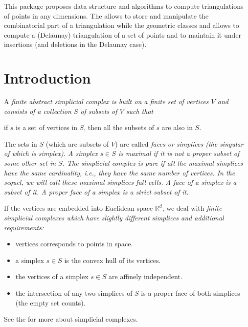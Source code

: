 
\newcommand{\note}[1]{\begin{ccTexOnly}%
{\color{red}$\langle\!\langle$#1$\rangle\!\rangle$}\end{ccTexOnly}}
\newcommand{\sphere}{\ensuremath{\mathcal S}}
\renewcommand{\real}{\ensuremath{\mathbb R}}

This package proposes data structure and algorithms to compute
triangulations of points in any dimensions.
The  allows to store and manipulate the
combinatorial part of a triangulation while the geometric classes
 and  allows to 
compute a (Delaunay) triangulation of a set of points and to maintain
it under insertions (and deletions in the Delaunay case).


\section{Introduction\label{triangulation:intro}}

A \em{finite abstract simplicial complex} is built on a finite set of
vertices $V$ and consists of a collection $S$ of subsets of $V$ such that

\centerline{if $s$ is a set of vertices in $S$, then all the subsets of $s$ are also
in $S$.}

The sets in $S$ (which are subsets of $V$) are called
\em{faces} or \em{simplices} (the
singular of which is \em{simplex}).
%
A simplex $s\in S$ is \em{maximal} if it is not a proper subset of some other
set in $S$. The simplicial complex is \em{pure} %
if all the maximal simplices have the same cardinality, i.e., they have the same
number of vertices. 
In the sequel, we will call these maximal simplices \em{full cells}.
A \em{face} of a simplex is a subset of it.
A \em{proper face} of a simplex is a strict subset of it.

If the vertices are embedded into Euclidean space $\real^d$, we deal with
\em{finite simplicial complexes} which have slightly different simplices
and additional requirements:
\begin{itemize}
\item vertices corresponds to points in space.
\item a simplex $s\in S$ is the convex hull of its vertices.
\item the vertices of a simplex $s\in S$ are affinely independent.
\item the intersection of any two simplices of $S$ is a proper face of both
simplices (the empty set counts).
\end{itemize}
See the  for more about simplicial complexes.

